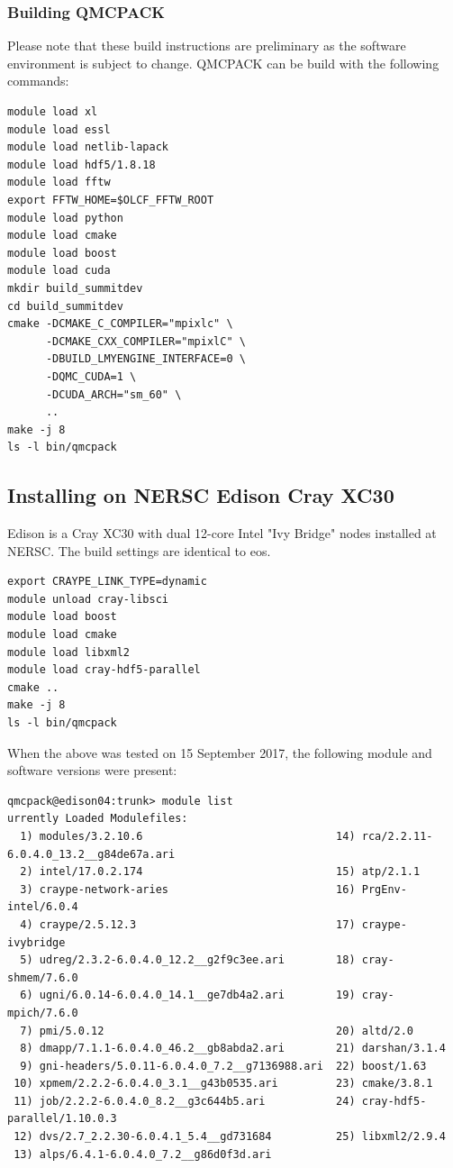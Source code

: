 \subsubsection{Building QMCPACK}
Please note that these build instructions are preliminary as the
software environment is subject to change. QMCPACK can be build with the following commands:
\begin{verbatim}
module load xl
module load essl
module load netlib-lapack
module load hdf5/1.8.18
module load fftw
export FFTW_HOME=$OLCF_FFTW_ROOT
module load python
module load cmake
module load boost
module load cuda
mkdir build_summitdev
cd build_summitdev
cmake -DCMAKE_C_COMPILER="mpixlc" \
      -DCMAKE_CXX_COMPILER="mpixlC" \
      -DBUILD_LMYENGINE_INTERFACE=0 \
      -DQMC_CUDA=1 \
      -DCUDA_ARCH="sm_60" \
      ..
make -j 8
ls -l bin/qmcpack
\end{verbatim}

\subsection{Installing on NERSC Edison Cray XC30}

Edison is a Cray XC30 with dual 12-core Intel "Ivy Bridge" nodes
installed at NERSC. The build settings are identical to eos.

\begin{verbatim}
export CRAYPE_LINK_TYPE=dynamic
module unload cray-libsci
module load boost
module load cmake
module load libxml2
module load cray-hdf5-parallel
cmake ..
make -j 8
ls -l bin/qmcpack
\end{verbatim}
When the above was tested on 15 September 2017, the following module and
software versions were present:
\begin{verbatim}
qmcpack@edison04:trunk> module list
urrently Loaded Modulefiles:
  1) modules/3.2.10.6                              14) rca/2.2.11-6.0.4.0_13.2__g84de67a.ari
  2) intel/17.0.2.174                              15) atp/2.1.1
  3) craype-network-aries                          16) PrgEnv-intel/6.0.4
  4) craype/2.5.12.3                               17) craype-ivybridge
  5) udreg/2.3.2-6.0.4.0_12.2__g2f9c3ee.ari        18) cray-shmem/7.6.0
  6) ugni/6.0.14-6.0.4.0_14.1__ge7db4a2.ari        19) cray-mpich/7.6.0
  7) pmi/5.0.12                                    20) altd/2.0
  8) dmapp/7.1.1-6.0.4.0_46.2__gb8abda2.ari        21) darshan/3.1.4
  9) gni-headers/5.0.11-6.0.4.0_7.2__g7136988.ari  22) boost/1.63
 10) xpmem/2.2.2-6.0.4.0_3.1__g43b0535.ari         23) cmake/3.8.1
 11) job/2.2.2-6.0.4.0_8.2__g3c644b5.ari           24) cray-hdf5-parallel/1.10.0.3
 12) dvs/2.7_2.2.30-6.0.4.1_5.4__gd731684          25) libxml2/2.9.4
 13) alps/6.4.1-6.0.4.0_7.2__g86d0f3d.ari
\end{verbatim}


